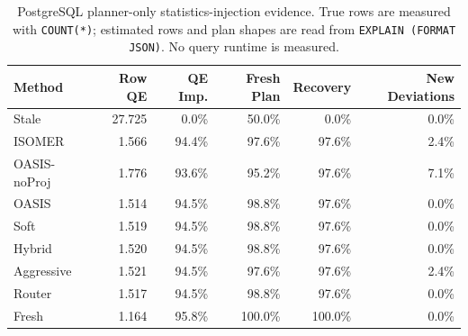 \begin{table}[t]
  \centering
  \small
  \caption{PostgreSQL planner-only statistics-injection evidence. True rows are measured with \texttt{COUNT(*)}; estimated rows and plan shapes are read from \texttt{EXPLAIN (FORMAT JSON)}. No query runtime is measured.}
  \label{tab:postgres_planner_stats_injection}
  \setlength{\tabcolsep}{4pt}
  \begin{tabular}{lrrrrr}
    \toprule
    Method & Row QE & QE Imp. & Fresh Plan & Recovery & New Deviations \\
    \midrule
    Stale & 27.725 & 0.0\% & 50.0\% & 0.0\% & 0.0\% \\
    ISOMER & 1.566 & 94.4\% & 97.6\% & 97.6\% & 2.4\% \\
    OASIS-noProj & 1.776 & 93.6\% & 95.2\% & 97.6\% & 7.1\% \\
    OASIS & 1.514 & 94.5\% & 98.8\% & 97.6\% & 0.0\% \\
    Soft & 1.519 & 94.5\% & 98.8\% & 97.6\% & 0.0\% \\
    Hybrid & 1.520 & 94.5\% & 98.8\% & 97.6\% & 0.0\% \\
    Aggressive & 1.521 & 94.5\% & 97.6\% & 97.6\% & 2.4\% \\
    Router & 1.517 & 94.5\% & 98.8\% & 97.6\% & 0.0\% \\
    Fresh & 1.164 & 95.8\% & 100.0\% & 100.0\% & 0.0\% \\
    \bottomrule
  \end{tabular}
\end{table}
